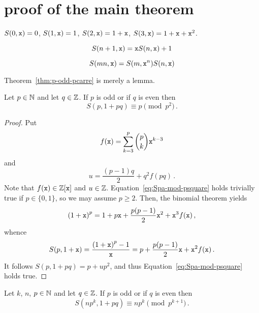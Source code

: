 
\section{proof of the main theorem}


   $S(0, \mathtt{x}) = 0$, $S(1, \mathtt{x}) = 1$, $S(2, \mathtt{x}) = 1 + \mathtt{x}$, $S(3, \mathtt{x}) = 1 + \mathtt{x} + \mathtt{x}^2$.

   $$
   S(n + 1, \mathtt{x}) = \mathtt{x} S(n, \mathtt{x}) + 1
   $$

   $$
   S(mn, \mathtt{x}) = S(m, \mathtt{x}^n) S(n, \mathtt{x})
   $$

   

   Theorem~\ref{thm:p-odd-pcarre} is merely a lemma.

 \begin{theorem} \label{thm:p-odd-pcarre}
   Let $p \in \mathbb{N}$ and let $q \in \mathbb{Z}$.
   If $p$ is odd or if $q$ is even then
   \begin{equation} \label{eq:Spa-mod-psquare}
     S(p, 1 + pq) \equiv p \pmod {p^2}\, .
   \end{equation}
 \end{theorem}


 \begin{proof}
   Put 
   $$
   f(\mathtt{x}) = \sum_{k = 3}^p \binom{p}{k} \mathtt{x}^{k - 3} 
   $$
   and
   $$
   u =  \frac{(p - 1)q}{2}  + q^2 f(p q) \,.
   $$
   Note that $f(\mathtt{x}) \in \mathbb{Z}[\mathtt{x}]$ and $u \in \mathbb{Z}$.
   Equation~\eqref{eq:Spa-mod-psquare} holds trivially true if $p \in \{ 0, 1 \}$,
   so we may assume $p \ge 2$.
     Then, the binomial theorem yields
   $$
   {(1 + \mathtt{x})}^p
   =
   1 + p \mathtt{x} + \frac{p(p - 1)}{2} \mathtt{x}^2 + \mathtt{x}^3 f(\mathtt{x}) \,, 
   $$
   whence
   $$
   S(p, 1 + \mathtt{x})
   =
   \frac{{(1 + \mathtt{x})}^p - 1}{\mathtt{x}}
   =
   p + \frac{p(p - 1)}{2} \mathtt{x} + \mathtt{x}^2 f(\mathtt{x}) \,.
   $$
   It follows $S(p, 1 + p q) =  p + u p^2$,
   and thus Equation~\eqref{eq:Spa-mod-psquare} holds true.
 \end{proof}

 
 \begin{theorem} \label{thm:p-odd-pk}
   Let $k$, $n$, $p \in \mathbb{N}$ and let $q \in \mathbb{Z}$.
   If $p$ is odd or if $q$ is even then
   \begin{equation} \label{eq:Spa-mod-pk}
     S(n p^k, 1 + p q) \equiv n p^k \pmod {p^{k + 1} } \,.
   \end{equation}
 \end{theorem}


